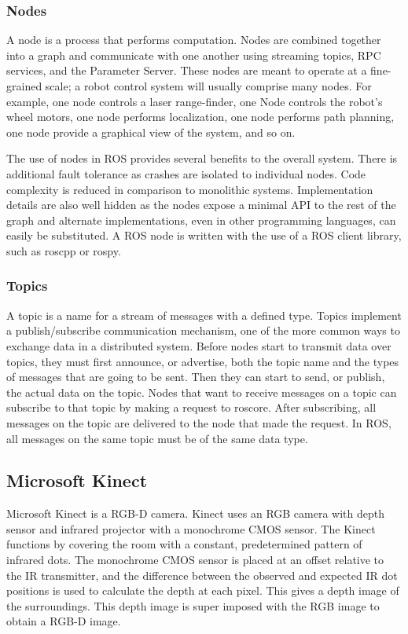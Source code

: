 \documentclass[journal]{IEEEtran}
\begin{document}
\subsubsection{Nodes}
A node is a process that performs computation. Nodes are combined together into a graph and communicate with one another using streaming topics, RPC services, and the Parameter Server. These nodes are meant to operate at a fine-grained scale; a robot control system will usually comprise many nodes. For example, one node controls a laser range-finder, one Node controls the robot's wheel motors, one node performs localization, one node performs path planning, one node provide a graphical view of the system, and so on.

The use of nodes in ROS provides several benefits to the overall system. There is additional fault tolerance as crashes are isolated to individual nodes. Code complexity is reduced in comparison to monolithic systems. Implementation details are also well hidden as the nodes expose a minimal API to the rest of the graph and alternate implementations, even in other programming languages, can easily be substituted.
A ROS node is written with the use of a ROS client library, such as roscpp or rospy.

\subsubsection{Topics}
A topic is a name for a stream of messages with a defined type. Topics implement a publish/subscribe communication mechanism, one of the more common ways to exchange data in a distributed system. Before nodes start to transmit data over topics, they must first announce, or advertise, both the topic name and the types of messages that are going to be sent. Then they can start to send, or publish, the actual data on the topic. 
Nodes that want to receive messages on a topic can subscribe to that topic by
making a request to roscore. After subscribing, all messages on the topic are delivered to
the node that made the request.
In ROS, all messages on the same topic must be of the same data type. 	
 
\subsection{Microsoft Kinect}
Microsoft Kinect is a RGB-D camera.
Kinect uses an RGB camera with depth sensor and infrared projector with a monochrome CMOS sensor. The Kinect functions by covering the room with a constant, predetermined pattern of infrared dots. The monochrome CMOS sensor is placed at an offset relative to the IR transmitter, and the difference between the observed and expected IR dot positions is used to calculate the depth at each pixel. This gives a depth image of the surroundings. This depth image is super imposed with the RGB image to obtain a RGB-D image.
\end{document}
